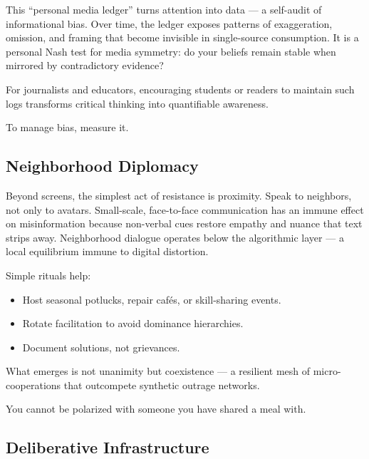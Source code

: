 \documentclass[12pt,twoside]{book}
\begin{document}
This “personal media ledger” turns attention into data --- a self-audit of informational bias.  
Over time, the ledger exposes patterns of exaggeration, omission, and framing that become invisible in single-source consumption.  
It is a personal Nash test for media symmetry: do your beliefs remain stable when mirrored by contradictory evidence?

For journalists and educators, encouraging students or readers to maintain such logs transforms critical thinking into quantifiable awareness.  \\

\begin{keyidea}
To manage bias, measure it.
\end{keyidea}

\subsection*{Neighborhood Diplomacy}

Beyond screens, the simplest act of resistance is proximity.  
Speak to neighbors, not only to avatars.  
Small-scale, face-to-face communication has an immune effect on misinformation because non-verbal cues restore empathy and nuance that text strips away.  
Neighborhood dialogue operates below the algorithmic layer --- a local equilibrium immune to digital distortion.

Simple rituals help:
\begin{itemize}
  \item Host seasonal potlucks, repair cafés, or skill-sharing events.  
  \item Rotate facilitation to avoid dominance hierarchies.  
  \item Document solutions, not grievances.  
\end{itemize}

What emerges is not unanimity but coexistence --- a resilient mesh of micro-cooperations that outcompete synthetic outrage networks.   \\

\begin{keyidea}
You cannot be polarized with someone you have shared a meal with.
\end{keyidea}

\subsection*{Deliberative Infrastructure}
\end{document}
